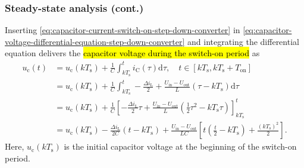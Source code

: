 \begin{frame}
    \frametitle{Steady-state analysis (cont.)}
    Inserting \eqref{eq:capacitor-current-switch-on-step-down-converter} in \eqref{eq:capacitor-voltage-differential-equation-step-down-converter} and integrating the differential equation delivers the \hl{capacitor voltage during the switch-on period} as
    \begin{equation}
        \begin{split}
            u_\mathrm{c}(t) &= u_\mathrm{c}(k T_\mathrm{s}) + \frac{1}{C}\int_{k T_\mathrm{s}}^t i_\mathrm{C}(\tau) \mathrm{d}\tau , \quad t\in [k T_\mathrm{s}, k T_\mathrm{s} + T_\mathrm{on}]\\
            &= u_\mathrm{c}(k T_\mathrm{s}) + \frac{1}{C}\int_{k T_\mathrm{s}}^t -\frac{\Delta i_\mathrm{L}}{2} + \frac{U_\mathrm{in}-U_\mathrm{out}}{L} (\tau -k T_\mathrm{s}) \mathrm{d}\tau\\
            &=u_\mathrm{c}(k T_\mathrm{s}) + \frac{1}{C} \left[-\frac{\Delta i_\mathrm{L}}{2}\tau + \frac{U_\mathrm{in}-U_\mathrm{out}}{L} (\frac{1}{2}\tau^2 -k T_\mathrm{s}\tau)\right]_{k T_\mathrm{s}}^t\\
            &=u_\mathrm{c}(k T_\mathrm{s}) - \frac{\Delta i_\mathrm{L}}{2 C}(t- kT_\mathrm{s}) + \frac{U_\mathrm{in}-U_\mathrm{out}}{LC} \left[t(\frac{t}{2}-kT_\mathrm{s}) + \frac{(kT_\mathrm{s})^2}{2}\right].
        \end{split}
        \label{eq:capacitor-voltage-switch-on-step-down-converter}
    \end{equation}
    Here, $u_\mathrm{c}(k T_\mathrm{s})$ is the initial capacitor voltage at the beginning of the switch-on period.
\end{frame}

